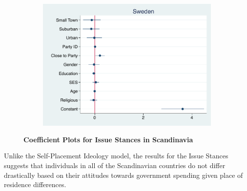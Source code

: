 \documentclass[12pt, titlepage]{article}
\newcommand\tb{\textbf}
\begin{document}
\begin{figure}[H]
\begin{subfigure}[b]{0.475\textwidth}
		\includegraphics[width=\textwidth]{LibCoef/Sweden}
	\end{subfigure}
	\caption[ \tb{Issue Stances - Scandinavia} ]
	{\tb {Coefficient Plots for Issue Stances in Scandinavia} }
	\label{ScandinaviaLib}
\end{figure}

Unlike the Self-Placement Ideology model, the results for the Issue Stances suggests that individuals in all of the Scandinavian countries do not differ drastically based on their attitudes towards government spending given place of residence differences. 
\end{document}
